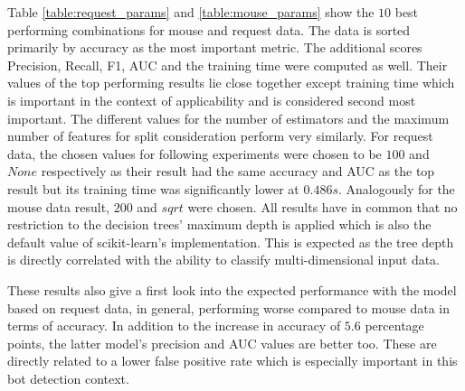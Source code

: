 \documentclass[
    fontsize=12pt,
    headings=small,
    parskip=half,           %
    bibliography=totoc,
    numbers=noenddot,       %
    open=any,               %
    final,                   %
    table
]{scrreprt}
\begin{document}
Table \ref{table:request_params} and \ref{table:mouse_params} show the $10$ best performing combinations for mouse  and request data. The data is sorted primarily by accuracy as the most important metric. The additional scores Precision, Recall, F1, AUC and the training time were computed as well. Their values of the top performing results lie close together except training time which is important in the context of applicability and is considered second most important. The different values for the number of estimators and the maximum number of features for split consideration perform very similarly. For request data, the chosen values for following experiments were chosen to be $100$ and $None$ respectively as their result had the same accuracy and AUC as the top result but its training time was significantly lower at $0.486s$. Analogously for the mouse data result, $200$ and $sqrt$ were chosen. All results have in common that no restriction to the decision trees' maximum depth is applied which is also the default value of scikit-learn's implementation. This is expected as the tree depth is directly correlated with the ability to classify multi-dimensional input data.

These results also give a first look into the expected performance with the model based on request data, in general, performing worse compared to mouse data in terms of accuracy. In addition to the increase in accuracy of $5.6$ percentage points, the latter model's precision and AUC values are better too. These are directly related to a lower false positive rate which is especially important in this bot detection context.
\end{document}

